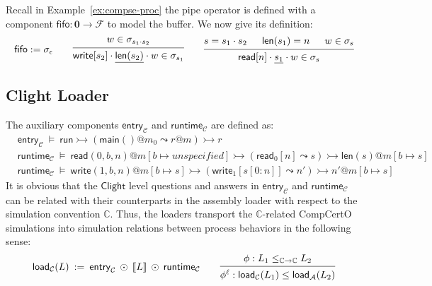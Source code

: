 \documentclass[acmsmall,nonacm]{acmart}
\newcommand{\kw}[1]{\ensuremath{ \mathsf{#1} }}
\begin{document}
Recall in Example~\ref{ex:compse-proc}
the pipe operator
is defined with
a component $\kw{fifo} : \mathbf{0} \rightarrow \mathcal{F}$ to model
the buffer.
We now give its definition:
\[
  \kw{fifo} := \sigma_\epsilon
  \qquad
  \begin{prooftree}
    \hypo{w \in \sigma_{s_1 \cdot s_2}}
    \infer1{\kw{write}[s_2] \cdot \underline{\kw{len}(s_2)} \cdot w \in \sigma_{s_1}}
  \end{prooftree}
  \qquad
  \begin{prooftree}
    \hypo{s = s_1 \cdot s_2}
    \hypo{\kw{len}(s_1) = n}
    \hypo{w \in \sigma_s}
    \infer3{\kw{read}[n] \cdot \underline{s_1} \cdot w \in \sigma_s}
  \end{prooftree}
\]

\subsection{Clight Loader}

The auxiliary components
$\kw{entry}_\mathcal{C}$ and
$\kw{runtime}_\mathcal{C}$
are defined as:
{\small
\begin{align*}
  & \kw{entry}_\mathcal{C} \:\vDash\:
  \kw{run} \rightarrowtail
  (\kw{main}()@m_0 \leadsto r@m) \rightarrowtail r \\
  & \kw{runtime}_\mathcal{C} \:\vDash\:
  \kw{read}(0, b, n)@m[b \mapsto unspecified]
   \rightarrowtail (\kw{read}_0[n] \leadsto s)
    \rightarrowtail \kw{len}(s)@m[b \mapsto s] \\
  & \kw{runtime}_\mathcal{C} \:\vDash\:
    \kw{write}(1, b, n)@m[b \mapsto s]
   \rightarrowtail
  (\kw{write}_1[s[0:n]] \leadsto n')
  \rightarrowtail n'@m[b \mapsto s]
\end{align*}}%
It is obvious that
the \kw{Clight} level
questions and answers
in $\kw{entry}_\mathcal{C}$ and $\kw{runtime}_\mathcal{C}$
can be related
with their counterparts in the assembly loader
with respect to
the simulation convention $\mathbb{C}$.
Thus, the loaders
transport
the $\mathbb{C}$-related CompCertO simulations
into
simulation relations
between process behaviors
in the following sense:
\[
  \kw{load}_\mathcal{C}(L)
  \::=\: \kw{entry}_\mathcal{C} \: \odot \: \llbracket L \rrbracket
  \: \odot \: \kw{runtime}_\mathcal{C}
  \qquad
  \begin{prooftree}
    \hypo{\phi: L_1 \le_{\mathbb{C} \rightarrow \mathbb{C}} L_2}
    \infer1{\phi^\ell: \kw{load}_\mathcal{C}(L_1) \le
      \kw{load}_\mathcal{A}(L_2)}
  \end{prooftree}
\]
\end{document}
